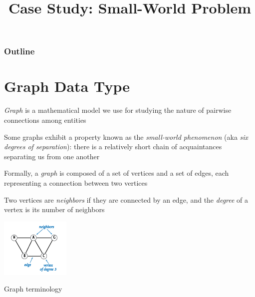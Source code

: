 \documentclass[8pt,a4paper,compress,handout]{beamer}
\title{Case Study: Small-World Problem}
\date{}
\begin{document}
\begin{frame}
\vfill
\titlepage
\end{frame}

\begin{frame}
\frametitle{Outline}
\tableofcontents
\end{frame}

\section{Graph Data Type}
\begin{frame}[fragile]
\emph{Graph} is a mathematical model we use for studying the nature of pairwise connections among entities

\bigskip

Some graphs exhibit a property known as the \emph{small-world phenomenon} (aka \emph{six degrees of separation}): there is a relatively short chain of acquaintances separating us from one another

\bigskip

Formally, a \emph{graph} is composed of a set of vertices and a set of edges, each representing a connection between two vertices

\bigskip

Two vertices are \emph{neighbors} if they are connected by an edge, and the \emph{degree} of a vertex is its number of neighbors

\begin{center}
\includegraphics[scale=0.5]{figures/graph.png}

\smallskip

\tiny Graph terminology
\end{center}
\end{frame}
\end{document}
